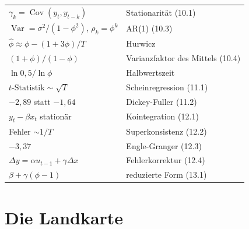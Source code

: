 \begin{merksatz}
\begin{center}
{\small
\renewcommand{\arraystretch}{1.6}
\begin{tabular}{@{}P{4.4cm}P{4.2cm}@{}}
\toprule
$\gamma_k = \operatorname{Cov}(y_t,y_{t-k})$ & Stationarität (10.1)\\
$\operatorname{Var} = \sigma^{2}/(1-\phi^{2})$, $\rho_k = \phi^{k}$ & AR(1) (10.3)\\
$\hat\phi \approx \phi - (1+3\phi)/T$ & Hurwicz\\
$(1+\phi)/(1-\phi)$ & Varianzfaktor des Mittels (10.4)\\
$\ln 0{,}5/\ln\phi$ & Halbwertszeit\\
$t\text{-Statistik} \sim \sqrt T$ & Scheinregression (11.1)\\
$-2{,}89$ statt $-1{,}64$ & Dickey-Fuller (11.2)\\
$y_t - \beta x_t$ stationär & Kointegration (12.1)\\
Fehler $\sim 1/T$ & Superkonsistenz (12.2)\\
$-3{,}37$ & Engle-Granger (12.3)\\
$\Delta y = \alpha u_{t-1} + \gamma\Delta x$ & Fehlerkorrektur (12.4)\\
$\beta + \gamma(\phi-1)$ & reduzierte Form (13.1)\\
\bottomrule
\end{tabular}}
\end{center}
\end{merksatz}

\section{Die Landkarte}

